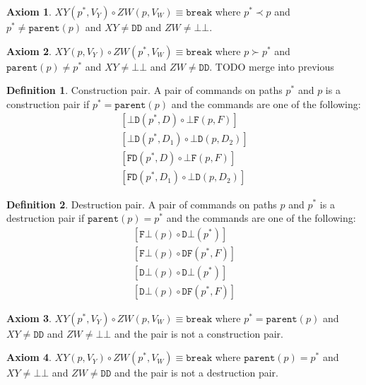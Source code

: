 \documentclass[12pt]{article}
\newcommand{\empt}{\bot}
\newcommand{\parent}{\mathtt{parent}}
\newcommand{\pp}{p^*} %
\newcommand{\cbrk}{\mathtt{break}}
\newcommand{\fscommand}[2]{{#1#2}}
\newcommand{\fsregcommandchar}[1]{\mathtt{#1}}
\newcommand{\fsregcommand}[2]{\fscommand{\fsregcommandchar{#1}}{\fsregcommandchar{#2}}}
\newcommand{\cbb}{\fsregcommand{\empt}{\empt}}
\newcommand{\cbf}{\fsregcommand{\empt}{F}}
\newcommand{\cbd}{\fsregcommand{\empt}{D}}
\newcommand{\cfb}{\fsregcommand{F}{\empt}}
\newcommand{\cfd}{\fsregcommand{F}{D}}
\newcommand{\cdb}{\fsregcommand{D}{\empt}}
\newcommand{\cdf}{\fsregcommand{D}{F}}
\newcommand{\cdd}{\fsregcommand{D}{D}}
\newcommand{\cxy}{\fscommand{X}{Y}}
\newcommand{\czw}{\fscommand{Z}{W}}
\newcommand{\cc}{\circ} %
\newcommand{\descendant}{\prec}
\newcommand{\ancestor}{\succ}
\theoremstyle{definition}
\newtheorem{mydef}{Definition}
\newtheorem{myax}{Axiom}
\begin{document}
\begin{myax}\label{ax_distantchild_breaks}
$\cxy(\pp,V_Y)\cc  \czw(p,V_W) \equiv \cbrk$ where $\pp\descendant p$ and $\pp\neq\parent(p)$ and $\cxy\neq\cdd$ and $\czw\neq\cbb$.
\end{myax}

\begin{myax}\label{ax_distantparent_breaks}
$\cxy(p,V_Y)\cc  \czw(\pp,V_W) \equiv \cbrk$ where $p\ancestor \pp$ and $\parent(p)\neq \pp$ and $\cxy\neq\cbb$ and $\czw\neq\cdd$.
TODO merge into previous
\end{myax}

\begin{mydef}{Construction pair.}
A pair of commands on paths $\pp$ and $p$ is a construction pair if $\pp=\parent(p)$ and the commands are one
of the following:
   \begin{gather*}
            [\cbd(\pp, D)\cc  \cbf(p, F)] \\
            [\cbd(\pp, D_1)\cc  \cbd(p, D_2)] \\
            [\cfd(\pp, D)\cc  \cbf(p, F)] \\
            [\cfd(\pp, D_1)\cc  \cbd(p, D_2)]
   \end{gather*}
\end{mydef}

\begin{mydef}{Destruction pair.}
A pair of commands on paths $p$ and $\pp$ is a destruction pair if $\parent(p)=\pp$ and the commands are one
of the following:
   \begin{gather*}
            [\cfb(p)\cc  \cdb(\pp)] \\
            [\cfb(p)\cc  \cdf(\pp, F)] \\
            [\cdb(p)\cc  \cdb(\pp)] \\
            [\cdb(p)\cc  \cdf(\pp, F)]
   \end{gather*}
\end{mydef}

\begin{myax}\label{ax_directchild_breaks}
$\cxy(\pp,V_Y)\cc  \czw(p,V_W) \equiv \cbrk$ where $\pp=\parent(p)$ and $\cxy\neq\cdd$ and $\czw\neq\cbb$
and the pair is not a construction pair.
\end{myax}

\begin{myax}\label{ax_directparent_breaks}
$\cxy(p,V_Y)\cc  \czw(\pp,V_W) \equiv \cbrk$ where $\parent(p)=\pp$ and $\cxy\neq\cbb$ and $\czw\neq\cdd$
and the pair is not a destruction pair.
\end{myax}
\end{document}
